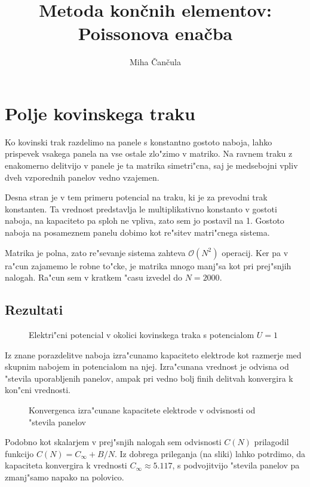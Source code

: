 \documentclass[a4paper,10pt]{article}
\title{Metoda kon\v cnih elementov: \\ Poissonova ena\v cba}
\author{Miha \v Can\v cula}
\begin{document}
\maketitle

\section{Polje kovinskega traku}

Ko kovinski trak razdelimo na panele s konstantno gostoto naboja, lahko prispevek vsakega panela na vse ostale zlo"zimo v matriko. Na ravnem traku z enakomerno delitvijo v panele je ta matrika simetri"cna, saj je medsebojni vpliv dveh vzporednih panelov vedno vzajemen. 

Desna stran je v tem primeru potencial na traku, ki je za prevodni trak konstanten. Ta vrednost predstavlja le multiplikativno konstanto v gostoti naboja, na kapaciteto pa sploh ne vpliva, zato sem jo postavil na 1. Gostoto naboja na posameznem panelu dobimo kot re"sitev matri"cnega sistema. 

Matrika je polna, zato re"sevanje sistema zahteva $\mathcal{O}(N^2)$ operacij. Ker pa v ra"cun zajamemo le robne to"cke, je matrika mnogo manj"sa kot pri prej"snjih nalogah. Ra"cun sem v kratkem "casu izvedel do $N = 2000$. 

\subsection{Rezultati}

\begin{figure}[H]

\caption{Elektri"cni potencial v okolici kovinskega traka s potencialom $U = 1$}
\label{fig:trak-polje}
\end{figure}

Iz znane porazdelitve naboja izra"cunamo kapaciteto elektrode kot razmerje med skupnim nabojem in potencialom na njej. Izra"cunana vrednost je odvisna od "stevila uporabljenih panelov, ampak pri vedno bolj finih delitvah konvergira k kon"cni vrednosti. 

\begin{figure}[H]

\caption{Konvergenca izra"cunane kapacitete elektrode v odvisnosti od "stevila panelov} 
\end{figure}

Podobno kot skalarjem v prej"snjih nalogah sem odvisnosti $C(N)$ prilagodil funkcijo $C(N) = C_\infty + B/N$. Iz dobrega prileganja (na sliki) lahko potrdimo, da kapaciteta konvergira k vrednosti $C_\infty \approx 5.117$, s podvojitvijo "stevila panelov pa zmanj"samo napako na polovico. 
\end{document}
